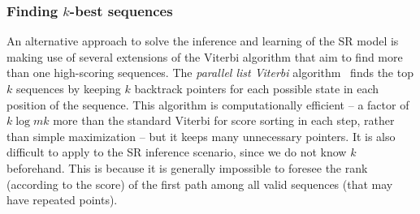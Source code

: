 

\subsubsection{Finding $k$-best sequences}

An alternative approach to solve the inference and learning of the SR model is making use of 
several extensions of the Viterbi algorithm that aim to find more than one high-scoring sequences.
The \emph{parallel list Viterbi} algorithm~\cite{seshadri1994list} finds the top $k$ sequences
by keeping $k$ backtrack pointers for each possible state in each position of the sequence.
This algorithm is computationally efficient
-- a factor of $k\log mk$ %
more than the standard Viterbi for score sorting in each step, rather than simple maximization
-- but it keeps many unnecessary pointers. It is also difficult to apply to the SR inference scenario,
since we do not know $k$ beforehand. This is because it is generally impossible to foresee
the rank (according to the score) of the first path among all valid sequences (that may have repeated points).

